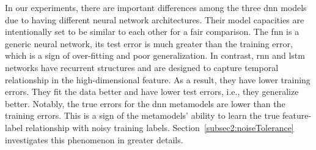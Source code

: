 In our experiments, there are important differences among the three \gls{dnn} models due to having different neural network architectures.
Their model capacities are intentionally set to be similar to each other for a fair comparison.
The \gls{fnn} is a generic neural network, its test error is much greater than the training error, which is a sign of over-fitting and poor generalization.
In contrast, \gls{rnn} and \gls{lstm} networks have recurrent structures and are designed to capture temporal relationship in the high-dimensional feature.
As a result, they have lower training errors.
They fit the data better and have lower test errors, i.e., they generalize better.
Notably, the true errors for the \gls{dnn} metamodels are lower than the training errors.
This is a sign of the metamodels' ability to learn the true feature-label relationship with noisy training labels. 
Section~\ref{subsec2:noiseTolerance} investigates this phenomenon in greater details.

